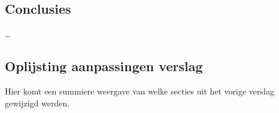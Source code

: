 \documentclass[tt1]{penoverslag}
\begin{document}
\subsection{Conclusies}
\ldots

\subsection{Oplijsting aanpassingen verslag}
Hier komt een summiere weergave van welke secties uit het vorige verslag gewijzigd werden.










\end{document}
